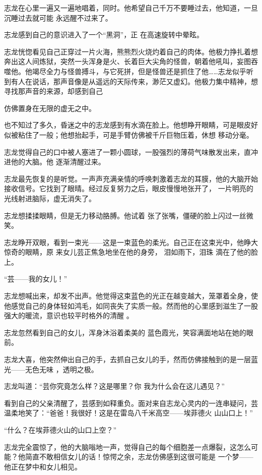 \documentclass{article}
\begin{document}
志龙在心里一遍又一遍地唱着，同时。他希望自己千万不要睡过去，他知道，一旦沉睡过去就可能
永远醒不过来了。 

志龙感到自己的意识进入了一个“黑洞”，正
在高速旋转中晕眩。 

志龙恍惚看见自己正穿过一片火海，熊熊烈火烧灼着自己的肉体。他极力挣扎着想奔出这人间炼狱，突然一头浑身是火、长着巨大尖角的怪兽，朝着他吼叫，妄图吞噬他。他竭尽全力与怪兽搏斗，与它死拼，但是怪兽还是抓住了他……志龙似乎听到有人在说话，那声音像是从遥远的天际传来，渺茫又虚幻。他极力集中精神，想寻找那声音的来源，却感到自己
\newpage

仿佛置身在无限的虚无之中。 

也不知过了多久，昏迷之中的志龙感到有水滴在脸上。他想睁开眼睛，可是眼皮好似被粘住了一般；他想抬起手，可是手臂仿佛被千斤巨物压着，休想
移动分毫。 

志龙觉得自己的口中被人塞进了一颗小圆球，一股强烈的薄荷气味散发出来，直冲进他的大脑。他
逐渐清醒过来。 

志龙最先恢复的是听觉。一声声充满亲情的呼唤刺激着志龙的耳膜，他的大脑开始接收信号。它找到了眼晴。经过反复努力之后，眼皮慢慢地张开了，
一片明亮的光线射进脑际，虚无消失了。 

志龙想揉揉眼睛，但是无力移动胳膊。他试着
张了张嘴，僵硬的脸上闪过一丝微笑。 

志龙睁开双眼，看到一束光——这是一束蓝色的柔光。自己正在这束光中，他睁大惊奇的眼睛，原
\newpage
来女儿芸正焦急地坐在他的身旁， 泪如雨下，泪珠
滴在了他的脸上。 


“芸——我的女儿！” 

志龙想喊出来，却发不出声。他觉得这束蓝色的光正在越变越大，笼罩着全身，使他感觉自己的身体轻如鸿毛，如同丧失了实质一般。然而他的心里感到滋生了一股强大的暖流，意识也较平时格外的清醒
。 

志龙忽然看到自己的女儿，浑身沐浴着柔美的
蓝色霞光，笑容满面地站在她的眼前。 

志龙大喜，他突然伸出自己的手，去抓自己女儿的手，然而仿佛接触到的是一层蓝光——无色无味
，透明之极。 

志龙叫道：“芸你究竟怎么样？这是哪里？你
我为什么会在这儿遇见？” 

\newpage

看到自己的父亲清醒了，芸感到如释重负。面对来自志龙心灵内的一连串疑问，芸温柔地笑了：“爸爸！我很好！这是在雷岛八千米高空——埃菲德火
山山口上！” 


“什么？在埃菲德火山的山口上空？” 

志龙完全震惊了，他的大脑嗡地一声，觉得自己的每个细胞差一点爆裂，这怎么可能？他简直不敢相信女儿的话！惊愕之余，志龙仿佛感到这很可能是
一个梦——他正在梦中和女儿相见。 
\end{document}
